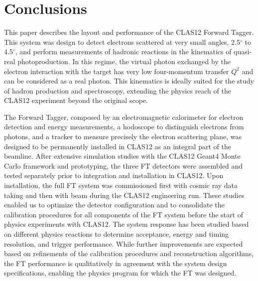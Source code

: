 \section{Conclusions}

This paper describes the layout and performance of the CLAS12 Forward Tagger. This system was design to detect
electrons scattered at very small angles, 2.5$^\circ$ to 4.5$^\circ$, and perform measurements of hadronic reactions
in the kinematics of quasi-real photoproduction. In this regime, the virtual photon exchanged by the electron
interaction with the target has very low four-momentum transfer $Q^2$ and can be considered as a real photon. This
kinematics is ideally suited for the study of hadron production and spectroscopy,  extending the physics reach of the
CLAS12 experiment beyond the original scope.

The Forward Tagger, composed by an electromagnetic calorimeter for electron detection and energy measurements,
a hodoscope to distinguish electrons from photons, and a tracker to measure precisely the electron
scattering plane, was designed to be permanently installed in CLAS12 as an integral part of the beamline. After
extensive simulation studies with the CLAS12 Geant4 Monte Carlo framework and prototyping, the three FT
detectors were assembled and tested separately prior to integration and installation in CLAS12. Upon installation, the
full FT system was commissioned first with cosmic ray data taking and then with beam during the CLAS12 engineering
run. These studies enabled us to optimize the detector configuration and to consolidate the calibration procedures for
all components of the FT system before the start of physics experiments with CLAS12. The system response has been
studied based on different physics reactions to determine acceptance, energy and timing resolution, and trigger
performance. While further improvements are expected based on refinements of the calibration procedures and
reconstruction algorithms, the FT performance is qualitatively in agreement with the system design specifications,
enabling the physics program for which the FT was designed.

